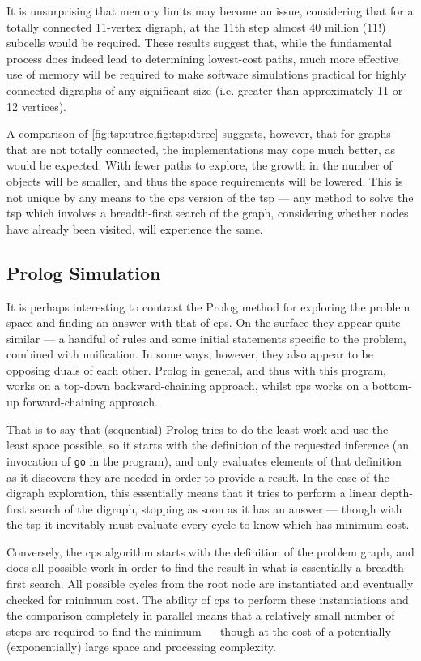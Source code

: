 It is unsurprising that memory limits may become an issue, considering that for a totally connected 11-vertex digraph, at the 11th step almost 40 million (\(11!\)) subcells would be required.  These results suggest that, while the fundamental process does indeed lead to determining lowest-cost paths, much more effective use of memory will be required to make software simulations practical for highly connected digraphs of any significant size (i.e. greater than approximately 11 or 12 vertices).

A comparison of \cref{fig:tsp:utree,fig:tsp:dtree} suggests, however, that for graphs that are not totally connected, the implementations may cope much better, as would be expected.  With fewer paths to explore, the growth in the number of objects will be smaller, and thus the space requirements will be lowered.  This is not unique by any means to the \gls{cps} version of the \gls{tsp} --- any method to solve the \gls{tsp} which involves a breadth-first search of the graph, considering whether nodes have already been visited, will experience the same. 

\subsection{Prolog Simulation}

It is perhaps interesting to contrast the Prolog method for exploring the problem space and finding an answer with that of \gls{cps}.  On the surface they appear quite similar --- a handful of rules and some initial statements specific to the problem, combined with unification.   In some ways, however, they also appear to be opposing duals of each other.  Prolog in general, and thus with this program, works on a top-down backward-chaining approach, whilst \gls{cps} works on a bottom-up forward-chaining approach.

That is to say that (sequential) Prolog tries to do the least work and use the least space possible, so it starts with the definition of the requested inference (an invocation of \texttt{go} in the program), and only evaluates elements of that definition as it discovers they are needed in order to provide a result.  In the case of the digraph exploration, this essentially means that it tries to perform a linear depth-first search of the digraph, stopping as soon as it has an answer --- though with the \gls{tsp} it inevitably must evaluate every cycle to know which has minimum cost.

Conversely, the \gls{cps} algorithm starts with the definition of the problem graph, and does all possible work in order to find the result in what is essentially a breadth-first search.  All possible cycles from the root node are instantiated and eventually checked for minimum cost. The ability of \gls{cps} to perform these instantiations and the comparison completely in parallel means that a relatively small number of steps are required to find the minimum --- though at the cost of a potentially (exponentially) large space and processing complexity.

